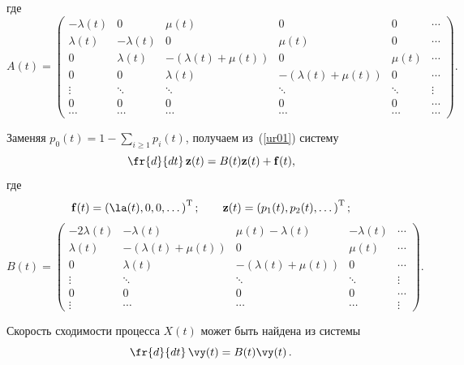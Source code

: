 \noindent
 где
\begin{equation*}
A(t)= { \left(
\begin{array}{ccccccc}
-\lambda(t)  & 0          & \mu(t)                          & 0      & 0      &\cdots  \\
\lambda(t)  &-\lambda(t) & 0                               & \mu(t) & 0      &\cdots  \\
0          &\lambda(t)  & -\left(\lambda(t)+\mu(t)\right) & 0      & \mu(t) &\cdots  \\
0          & 0          &\lambda(t)                       & -\left(\lambda(t)+\mu(t)\right) & 0      & \cdots  \\
\vdots      & \ddots     & \ddots                          & \ddots & \ddots & \vdots \\
0          & 0          & 0                               & 0      & 0      &\cdots \\
\cdots      & \cdots     & \cdots                          & \cdots & \cdots & \cdots
\end{array}
\right)}.
\end{equation*}



Заменяя $p_0(t) = 1 - \sum_{i \ge 1} p_i(t)$,
получаем из~(\ref{ur01}) систему
\begin{equation*}
\fr{d}{dt}\,\vz(t)= B(t)\vz(t)+\vf(t), %
\end{equation*}
\noindent
 где
$$
\vf(t)=\left( \la(t),  0, 0, \dots \right)^{\mathrm{T}}; \qquad
\vz(t)=\left(p_1(t), p_2(t),\dots \right)^{\mathrm{T}};
$$
\begin{equation*}
B(t) ={ \left(
\begin{array}{cccccc}
-2\lambda(t)  & -\lambda(t) & \mu(t)-\lambda(t) & -\lambda(t) &\cdots  \\
\lambda(t)         & -\left(\lambda(t)+\mu(t)\right) &0 & \mu(t) &\cdots  \\
0 &\lambda(t) & -\left(\lambda(t)+\mu(t)\right) &0  &\cdots  \\
\vdots & \ddots & \ddots & \ddots & \vdots  \\
0 & 0 & 0  & 0 &\cdots \\
\vdots & \cdots & \cdots & \cdots & \vdots
\end{array}
\right)}.
\end{equation*}

Скорость сходимости процесса $X(t)$ может быть найдена из системы
\begin{equation*}
\fr{d}{dt}\,\vy(t)= B(t)\vy(t)\,. %
\end{equation*}


